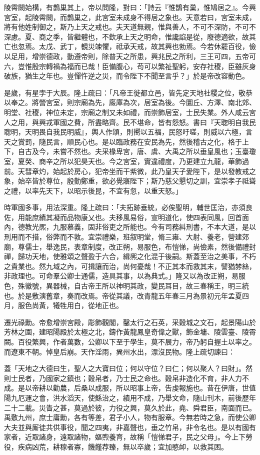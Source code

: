 \begin{pinyinscope}
陵霄闕始構，有鵲巢其上，帝以問隆，對曰：「詩云『惟鵲有巢，惟鳩居之』。今興宮室，起陵霄闕，而鵲巢之，此宮室未成身不得居之象也。天意若曰，宮室未成，將有他姓制御之，斯乃上天之戒也。夫天道無親，惟與善人，不可不深防，不可不深慮。夏、商之季，皆繼體也，不欽承上天之明命，惟讒諂是從，廢德適欲，故其亡也忽焉。太戊、武丁，覩災竦懼，祗承天戒，故其興也勃焉。今若休罷百役，儉以足用，增崇德政，動遵帝則，除普天之所患，興兆民之所利，三王可四，五帝可六，豈惟殷宗轉禍為福而已哉！臣備腹心，苟可以繁祉聖躬，安存社稷，臣雖灰身破族，猶生之年也。豈憚忤逆之災，而令陛下不聞至言乎？」於是帝改容動色。

是歲，有星孛于大辰。隆上疏曰：「凡帝王徙都立邑，皆先定天地社稷之位，敬恭以奉之。將營宮室，則宗廟為先，廄庫為次，居室為後。今圜丘、方澤、南北郊、明堂、社稷，神位未定，宗廟之制又未如禮，而崇飾居室，士民失業。外人咸云宮人之用，與興戎軍國之費，所盡略齊。民不堪命，皆有怨怒。書曰『天聦明自我民聦明，天明畏自我民明威』，輿人作頌，則嚮以五福，民怒吁嗟，則威以六極，言天之賞罰，隨民言，順民心也。是以臨政務在安民為先，然後稽古之化，格于上下，自古及今，未嘗不然也。夫采椽卑宮，唐、虞、大禹之所以垂皇風也；玉臺瓊室，夏癸、商辛之所以犯昊天也。今之宮室，實違禮度，乃更建立九龍，華飾過前。天彗章灼，始起於房心，犯帝坐而干紫微，此乃皇天子愛陛下，是以發教戒之象，始卒皆於尊位，殷勤鄭重，欲必覺寤陛下；斯乃慈父懇切之訓，宜崇孝子祗聳之禮，以率先天下，以昭示後昆，不宜有忽，以重天怒。」

時軍國多事，用法深重。隆上疏曰：「夫拓跡垂統，必俟聖明，輔世匡治，亦須良佐，用能庶績其凝而品物康乂也。夫移風易俗，宣明道化，使四表同風，回首面內，德教光熈，九服慕義，固非俗吏之所能也。今有司務糾刑書，不本大道，是以刑用而不措，俗弊而不敦。宜崇禮樂，班叙明堂，脩三雍、大射、養老，營建郊廟，尊儒士，舉逸民，表章制度，改正朔，易服色，布愷悌，尚儉素，然後備禮封禪，歸功天地，使雅頌之聲盈于六合，緝熈之化混于後嗣。斯蓋至治之美事，不朽之貴業也。然九域之內，可揖讓而治，尚何憂哉！不正其本而救其末，譬猶棼絲，非政理也。可命羣公卿士通儒，造具其事，以為典式。」隆又以為改正朔，易服色，殊徽號，異器械，自古帝王所以神明其政，變民耳目，故三春稱王，明三統也。於是敷演舊章，奏而改焉。帝從其議，改青龍五年春三月為景初元年孟夏四月，服色尚黃，犧牲用白，從地正也。

遷光祿勳。帝愈增崇宮殿，彫飾觀閣，鑿太行之石英，采穀城之文石，起景陽山於芳林之園，建昭陽殿於太極之北，鑄作黃龍鳳皇奇偉之獸，飾金墉、陵雲臺、陵霄闕。百役繁興，作者萬數，公卿以下至于學生，莫不展力，帝乃躬自握土以率之。而遼東不朝。悼皇后崩。天作淫雨，兾州水出，漂沒民物。隆上疏切諫曰：

蓋「天地之大德曰生，聖人之大寶曰位；何以守位？曰仁；何以聚人？曰財」。然則士民者，乃國家之鎮也；穀帛者，乃士民之命也。穀帛非造化不育，非人力不成。是以帝耕以勸農，后桑以成服，所以昭事上帝，告虔報施也。昔在伊唐，世值陽九厄運之會，洪水滔天，使鯀治之，績用不成，乃舉文命，隨山刊木，前後歷年二十二載。災眚之甚，莫過於彼，力役之興，莫久於此，堯、舜君臣，南面而已。禹敷九州，庶士庸勳，各有等差，君子小人，物有服章。今無若時之急，而使公卿大夫並與厮徒共供事役，聞之四夷，非嘉聲也，垂之竹帛，非令名也。是以有國有家者，近取諸身，遠取諸物，嫗煦養育，故稱「愷悌君子，民之父母」。今上下勞役，疾病凶荒，耕稼者寡，饑饉荐臻，無以卒歲；宜加愍卹，以救其困。


\end{pinyinscope}
